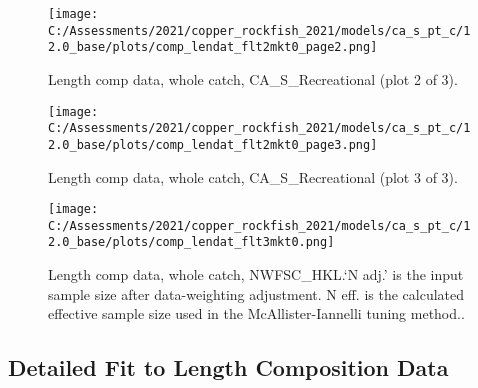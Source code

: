 \documentclass[11pt,
  english,
  a4paper,
]{article}
\begin{document}
\tagmcend\tagstructend


\begin{figure}
\centering
\texttt{[image: C:/Assessments/2021/copper\_rockfish\_2021/models/ca\_s\_pt\_c/12.0\_base/plots/comp\_lendat\_flt2mkt0\_page2.png]}
\caption{Length comp data, whole catch, CA\_S\_Recreational (plot 2 of 3).\label{fig:comp_lendat_flt2mkt0_page2}}
\end{figure}

\tagmcend\tagstructend


\begin{figure}
\centering
\texttt{[image: C:/Assessments/2021/copper\_rockfish\_2021/models/ca\_s\_pt\_c/12.0\_base/plots/comp\_lendat\_flt2mkt0\_page3.png]}
\caption{Length comp data, whole catch, CA\_S\_Recreational (plot 3 of 3).\label{fig:comp_lendat_flt2mkt0_page3}}
\end{figure}

\tagmcend\tagstructend


\begin{figure}
\centering
\texttt{[image: C:/Assessments/2021/copper\_rockfish\_2021/models/ca\_s\_pt\_c/12.0\_base/plots/comp\_lendat\_flt3mkt0.png]}
\caption{Length comp data, whole catch, NWFSC\_HKL.`N adj.' is the input sample size after data-weighting adjustment. N eff. is the calculated effective sample size used in the McAllister-Iannelli tuning method..\label{fig:comp_lendat_flt3mkt0}}
\end{figure}

\tagmcend\tagstructend

\newpage


\hypertarget{detailed-fit-to-length-composition-data}{%
\subsection{Detailed Fit to Length Composition Data}\label{detailed-fit-to-length-composition-data}}
\end{document}
